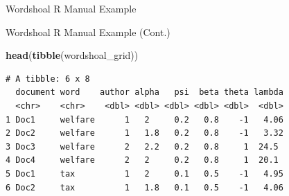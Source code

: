 \documentclass[
  ignorenonframetext,
  aspectratio=169]{beamer}
\newenvironment{Shaded}{\begin{snugshade}}{\end{snugshade}}
\newcommand{\AttributeTok}[1]{\textcolor[rgb]{0.13,0.29,0.53}{#1}}
\newcommand{\CommentTok}[1]{\textcolor[rgb]{0.56,0.35,0.01}{\textit{#1}}}
\newcommand{\DecValTok}[1]{\textcolor[rgb]{0.00,0.00,0.81}{#1}}
\newcommand{\FunctionTok}[1]{\textcolor[rgb]{0.13,0.29,0.53}{\textbf{#1}}}
\newcommand{\NormalTok}[1]{#1}
\newcommand{\OtherTok}[1]{\textcolor[rgb]{0.56,0.35,0.01}{#1}}
\newcommand{\SpecialCharTok}[1]{\textcolor[rgb]{0.81,0.36,0.00}{\textbf{#1}}}
\newcommand{\StringTok}[1]{\textcolor[rgb]{0.31,0.60,0.02}{#1}}
\begin{document}
\begin{frame}[fragile]{Wordshoal R Manual Example}
\begin{Shaded}
\end{Shaded}
\end{frame}

\begin{frame}[fragile]{Wordshoal R Manual Example (Cont.)}
\label{wordshoal-r-manual-example-cont.}
\scriptsize

\begin{Shaded}
\begin{Highlighting}[]
\FunctionTok{head}\NormalTok{(}\FunctionTok{tibble}\NormalTok{(wordshoal\_grid))}
\end{Highlighting}
\end{Shaded}

\begin{verbatim}
# A tibble: 6 x 8
  document word    author alpha   psi  beta theta lambda
  <chr>    <chr>    <dbl> <dbl> <dbl> <dbl> <dbl>  <dbl>
1 Doc1     welfare      1   2     0.2   0.8    -1   4.06
2 Doc2     welfare      1   1.8   0.2   0.8    -1   3.32
3 Doc3     welfare      2   2.2   0.2   0.8     1  24.5 
4 Doc4     welfare      2   2     0.2   0.8     1  20.1 
5 Doc1     tax          1   2     0.1   0.5    -1   4.95
6 Doc2     tax          1   1.8   0.1   0.5    -1   4.06
\end{verbatim}
\end{frame}
\end{document}

